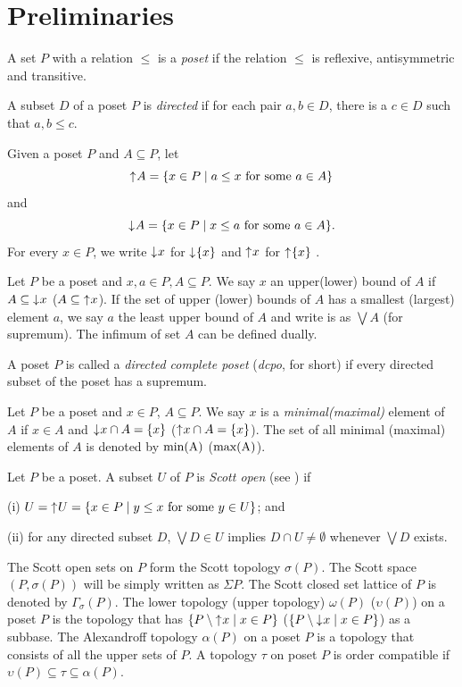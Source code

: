 \documentclass[preprint,12pt]{elsarticle}
\numberwithin{equation}{section}
\newcommand{\dn}{\mathord{\downarrow}\hspace{0.05em}}
\newcommand{\up}{\mathord{\uparrow}\hspace{0.05em}}
\begin{document}
\section{Preliminaries}



\quad A set $P$ with a relation $\leq$ is a {\em poset} if the relation $\leq$ is reflexive, antisymmetric and transitive.

\quad  A subset $D$ of a poset $P$ is {\em directed} if for each pair $a,b\in D$, there is a $c\in D$ such that $a,b\leq c$.

\quad Given a poset $P$ and $A\subseteq P$, let $$\up A=\{x\in P\mid a\leq x\ \mbox{for some}\ a\in A\}$$ and $$\dn A=\{x\in P\mid x\leq a\ \mbox{for some}\ a\in A\}.$$
For every $x\in P$, we write $\dn x$ for $\dn\{x\}$  and $\up x$ for $\up\{x\}$ .

\quad  Let $P$ be a poset and $x,a\in P, A\subseteq P$. We say $x$ an upper(lower) bound of $A$ if $A\subseteq\dn x$ ($A\subseteq\up x$). If the set of upper (lower) bounds of $A$ has a smallest (largest) element $a$, we say $a$ the least upper bound of $A$ and write is as $\bigvee A$ (for supremum). The infimum of set $A$ can be defined dually.


\quad  A poset $P$ is called a {\em directed complete poset} ({\em  dcpo}, for short) if every
directed subset of the poset has a supremum.

\quad Let $P$ be a poset and $x\in P$, $A\subseteq P$. We say $x$ is a {\em minimal(maximal)} element of $A$ if $x\in A$ and $\dn x\cap A=\{x\}$ ($\up x\cap A=\{x\}$). The set of all minimal (maximal) elements of $A$ is denoted by ${\rm min(A)}$ (${\rm max(A)}$).

\quad Let $P$ be a poset. A subset $U$ of  $P$ is {\em Scott open} (see \cite{GG03})
 if

 (i) $U=\up U=\{x\in P\mid y\leq x \ \mbox{for some}\ y\in U\}$; and

 (ii) for any directed subset $D$, $\bigvee D\in U$ implies
$D\cap U\neq \emptyset$ whenever $\bigvee D$ exists.

The Scott open sets on $P$ form the Scott topology $\sigma(P)$. The Scott space $(P, \sigma(P))$ will be simply written as $\Sigma P$. The Scott closed set lattice of $P$ is denoted by  $\Gamma_\sigma(P)$. The lower topology (upper topology) $\omega (P)$ ($\upsilon (P)$) on a poset $P$ is the topology that has $\{P\setminus\up x\mid x\in P\}$ ($\{P\setminus\dn x\mid x\in P\}$) as a subbase. The Alexandroff topology $\alpha (P)$ on a poset $P$ is a topology that consists of all the upper sets of $P$. A topology $\tau$ on poset $P$ is order compatible if $\upsilon(P)\subseteq \tau\subseteq\alpha(P)$.
\end{document}
